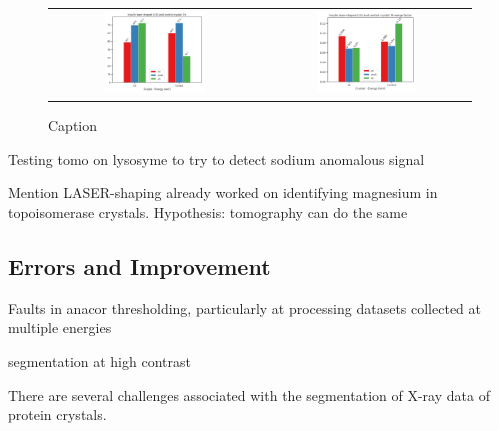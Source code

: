 \begin{figure}[h]
    \centering
    \begin{tabular}{cc}
    \includegraphics[width = 0.5\textwidth]{plots/exp2/ins_I_over_sigma.png} & \includegraphics[width = 0.5\textwidth]{plots/exp2/ins_rmerges.png}
    \end{tabular}
    \caption{Caption}
    \label{fig:insulin}
\end{figure}


Testing tomo on lysosyme to try to detect sodium anomalous signal

Mention LASER-shaping already worked on identifying magnesium in topoisomerase crystals. Hypothesis: tomography can do the same



\subsection{Errors and Improvement}

Faults in anacor thresholding, particularly at processing datasets collected at multiple energies

segmentation at high contrast

There are several challenges associated with the segmentation of X-ray data of protein crystals.